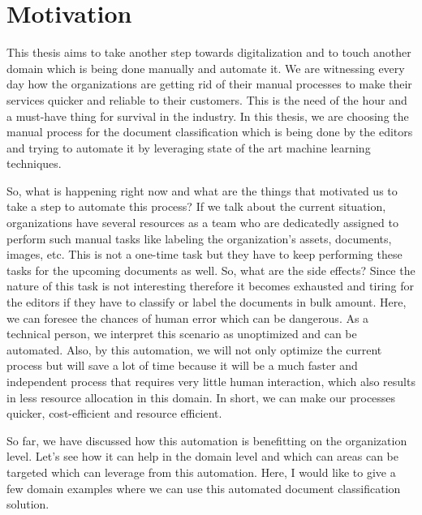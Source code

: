 \section{Motivation}
This thesis aims to take another step towards digitalization and to touch another domain which is being done manually and automate it. We are witnessing every day how the organizations are getting rid of their manual processes to make their services quicker and reliable to their customers. This is the need of the hour and a must-have thing for survival in the industry. In this thesis, we are choosing the manual process for the document classification which is being done by the editors and trying to automate it by leveraging state of the art machine learning techniques.
\newline
\par
So, what is happening right now and what are the things that motivated us to take a step to automate this process? If we talk about the current situation, organizations have several resources as a team who are dedicatedly assigned to perform such manual tasks like labeling the organization's assets, documents, images, etc. This is not a one-time task but they have to keep performing these tasks for the upcoming documents as well. So, what are the side effects? Since the nature of this task is not interesting therefore it becomes exhausted and tiring for the editors if they have to classify or label the documents in bulk amount. Here, we can foresee the chances of human error which can be dangerous. As a technical person, we interpret this scenario as unoptimized and can be automated. Also, by this automation, we will not only optimize the current process but will save a lot of time because it will be a much faster and independent process that requires very little human interaction, which also results in less resource allocation in this domain. In short, we can make our processes quicker, cost-efficient and resource efficient.
\newline
\par
So far, we have discussed how this automation is benefitting on the organization level. Let's see how it can help in the domain level and which can areas can be targeted which can leverage from this automation. Here, I would like to give a few domain examples where we can use this automated document classification solution.
\newline
\par
